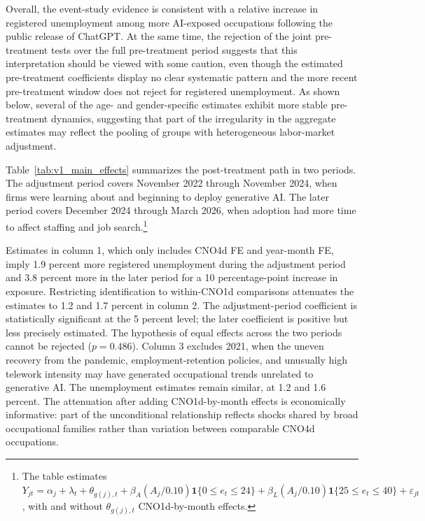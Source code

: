 Overall, the event-study evidence is consistent with a relative increase in registered unemployment among more AI-exposed occupations following the public release of ChatGPT. At the same time, the rejection of the joint pre-treatment tests over the full pre-treatment period suggests that this interpretation should be viewed with some caution, even though the estimated pre-treatment coefficients display no clear systematic pattern and the more recent pre-treatment window does not reject for registered unemployment. As shown below, several of the age- and gender-specific estimates exhibit more stable pre-treatment dynamics, suggesting that part of the irregularity in the aggregate estimates may reflect the pooling of groups with heterogeneous labor-market adjustment.



\setcounter{table}{1}


Table~\ref{tab:v1_main_effects} summarizes the post-treatment path in two periods. The adjustment period covers November 2022 through November 2024, when firms were learning about and beginning to deploy generative AI. The later period covers December 2024 through March 2026, when adoption had more time to affect staffing and job search.\footnote{The table estimates \(Y_{jt}=\alpha_j+\lambda_{t}+\theta_{g(j),t}+\beta_A(A_j/0.10)\mathbf{1}\{0\leq e_t\leq24\}+\beta_L(A_j/0.10)\mathbf{1}\{25\leq e_t\leq40\}+\varepsilon_{jt}\), with and without \(\theta_{g(j),t}\) CNO1d-by-month effects.}


Estimates in column 1, which only includes CNO4d FE and year-month FE, imply 1.9 percent more registered unemployment during the adjustment period and 3.8 percent more in the later period for a 10 percentage-point increase in exposure. Restricting identification to within-CNO1d comparisons attenuates the estimates to 1.2 and 1.7 percent in column 2. The adjustment-period coefficient is statistically significant at the 5 percent level; the later coefficient is positive but less precisely estimated. The hypothesis of equal effects across the two periods cannot be rejected (\(p=0.486\)). Column 3 excludes 2021, when the uneven recovery from the pandemic, employment-retention policies, and unusually high telework intensity may have generated occupational trends unrelated to generative AI. The unemployment estimates remain similar, at 1.2 and 1.6 percent. The attenuation after adding CNO1d-by-month effects is economically informative: part of the unconditional relationship reflects shocks shared by broad occupational families rather than variation between comparable CNO4d occupations.


